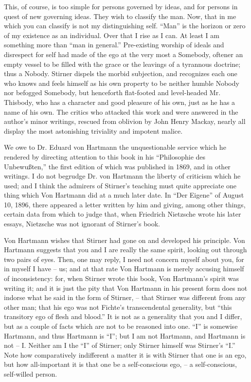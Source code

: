 \documentclass[12pt,a4paper]{book}
\begin{document}
This, of course, is too simple for persons governed by ideas, and for persons 
in quest of new governing ideas. They wish to classify the man. Now, that in 
me which you can classify is not my distinguishing self. ``Man'' is the 
horizon or zero of my existence as an individual. Over that I rise as I can. 
At least I am something more than ``man in general.'' Pre-existing worship 
of ideals and disrespect for self had made of the ego at the very most a 
Somebody, oftener an empty vessel to be filled with the grace or the leavings 
of a tyrannous doctrine; thus a Nobody. Stirner dispels the morbid subjection, 
and recognizes each one who knows and feels himself as his own property to be 
neither humble Nobody nor befogged Somebody, but henceforth flat-footed and 
level-headed Mr. Thisbody, who has a character and good pleasure of his own, 
just as he has a name of his own. The critics who attacked this work and were 
answered in the author's minor writings, rescued from oblivion by John Henry 
Mackay, nearly all display the most astonishing triviality and impotent 
malice.

We owe to Dr. Eduard von Hartmann the unquestionable service which he rendered 
by directing attention to this book in his ``Philosophie des 
Unbewu\ss{}ten,'' the first edition of which was published in 1869, and in 
other writings. I do not begrudge Dr. von Hartmann the liberty of criticism 
which he used; and I think the admirers of Stirner's teaching must quite 
appreciate one thing which Von Hartmann did at a much later date. In ``Der 
Eigene'' of August 10, 1896, there appeared a letter written by him and 
giving, among other things, certain data from which to judge that, when 
Friedrich Nietzsche wrote his later essays, Nietzsche was not ignorant of 
Stirner's book.

Von Hartmann wishes that Stirner had gone on and developed his principle. Von 
Hartmann suggests that you and I are really the same spirit, looking out 
through two pairs of eyes. Then, one may reply, I need not concern myself 
about you, for in myself I have -- us; and at that rate Von Hartmann is merely 
accusing himself of inconsistency: for, when Stirner wrote this book, Von 
Hartmann's spirit was writing it; and it is just the pity that Von Hartmann in 
his present form does not indorse what he said in the form of Stirner, -- that 
Stirner was different from any other man; that his ego was not Fichte's 
transcendental generality, but ``this transitory ego of flesh and blood.'' 
It is not as a generality that you and I differ, but as a couple of facts 
which are not to be reasoned into one. ``I'' is somewise Hartmann, and thus 
Hartmann is ``I''; but I am not Hartmann, and Hartmann is not -- I. Neither 
am I the ``I'' of Stirner; only Stirner himself was Stirner's ``I.'' Note 
how comparatively indifferent a matter it is with Stirner that one is an ego, 
but how all-important it is that one be a self-conscious ego, -- a 
self-conscious, self-willed person.
\end{document}
